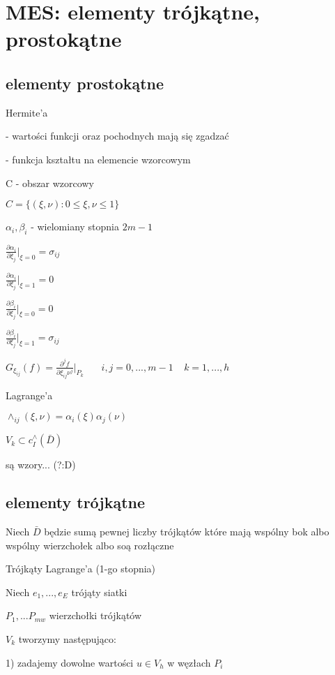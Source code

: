 \section{MES: elementy trójkątne, prostokątne}

\subsection{elementy prostokątne}

Hermite'a

- wartości funkcji oraz pochodnych mają się zgadzać

- funkcja kształtu na elemencie wzorcowym 

C - obszar wzorcowy 

$C = \{ (\xi,\nu): 0 \leqslant \xi,\nu \leqslant 1 \}$

$\alpha _i, \beta _i$ - wielomiany stopnia $2m - 1$

$\frac{\partial \alpha _i}{\partial \xi _j} |_{\xi = 0} = \sigma_{ij}$

$\frac{\partial \alpha _i}{\partial \xi _j} |_{\xi = 1} = 0$

$\frac{\partial \beta _i}{\partial \xi _j} |_{\xi = 0} = 0$

$\frac{\partial \beta _i}{\partial \xi _j} |_{\xi = 1} = \sigma_{ij}$

$G_{\xi_{ij}}(f) = \frac{\partial^j f}{\partial \xi_{ij} \nu^j} |_{P_k}\ \ \ \ \ \ \ \ i,j = 0,...,m-1\ \ \ \ \ k=1,...,h$

Lagrange'a

$\wedge_{ij} (\xi, \nu) = \alpha _i(\xi) \alpha _j(\nu)$

$V_k \subset c_I^\wedge (\bar{D})$

są wzory... (?:D)

\subsection{elementy trójkątne}

Niech $\bar{D}$ będzie sumą pewnej liczby trójkątów które mają wspólny bok albo wspólny wierzchołek albo soą rozłączne

Trójkąty Lagrange'a (1-go stopnia)

Niech $e_1,...,e_E$ trójąty siatki

$P_1,...P_{mw}$ wierzchołki trójkątów

$V_k$ tworzymy następująco:

1) zadajemy dowolne wartości $u \in V_h$ w węzłach $P_i$


